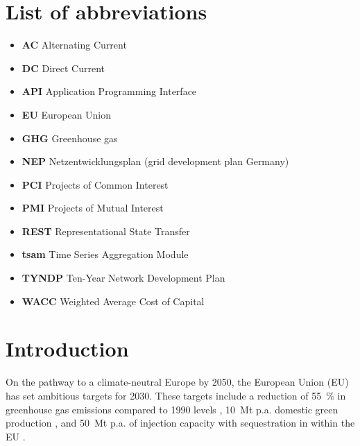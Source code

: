 \documentclass[preprint,12pt]{elsarticle}
\begin{document}


\section*{List of abbreviations}

\begin{itemize}[left=0pt, label={}, itemsep=0pt, parsep=0pt, topsep=0pt]
  \item \textbf{AC} \enspace Alternating Current
  \item \textbf{DC} \enspace Direct Current
  \item \textbf{API} \enspace Application Programming Interface
  \item \textbf{EU} \enspace European Union
  \item \textbf{GHG} \enspace Greenhouse gas
  \item \textbf{NEP} \enspace Netzentwicklungsplan (grid development plan Germany)
  \item \textbf{PCI} \enspace Projects of Common Interest
  \item \textbf{PMI} \enspace Projects of Mutual Interest
  \item \textbf{REST} \enspace Representational State Transfer 
  \item \textbf{tsam} \enspace Time Series Aggregation Module
  \item \textbf{TYNDP} \enspace Ten-Year Network Development Plan
  \item \textbf{WACC} \enspace Weighted Average Cost of Capital

\end{itemize}

\section{Introduction}
\label{sec:introduction}
On the pathway to a climate-neutral Europe by 2050, the European Union (EU) has set ambitious targets for 2030. These targets include a reduction of \SI{55}{\percent} in greenhouse gas emissions compared to 1990 levels \cite{europeancommissionFit55Delivering2021}, \SI{10}{Mt} p.a. domestic green  production \cite{europeancommissionREPowerEUPlanCommunication2022}, and \SI{50}{Mt} p.a. of  injection capacity with sequestration in within the EU \cite{europeanparliamentRegulationEU20242024}.
\end{document}

